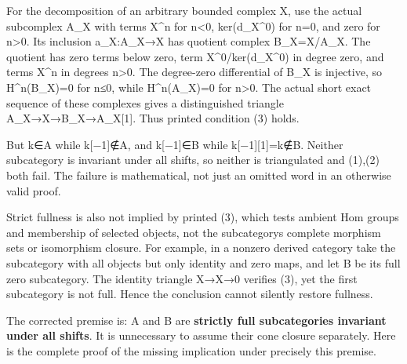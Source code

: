 For the decomposition of an arbitrary bounded complex X,\allowbreak{} use the actual subcomplex A\_\allowbreak{}X with terms X\^{}n for n<0,\allowbreak{} ker(d\_\allowbreak{}X\textasciicircum{}0)\allowbreak{} for n\allowbreak{}=0,\allowbreak{} and zero for n\textgreater0. Its inclusion a\_\allowbreak{}X:\allowbreak{}A\_\allowbreak{}X\allowbreak{}→X has quotient complex B\_\allowbreak{}X\allowbreak{}=X/\allowbreak{}A\_\allowbreak{}X. The quotient has zero terms below zero,\allowbreak{} term X\textasciicircum{}0/\allowbreak{}ker(d\_\allowbreak{}X\textasciicircum{}0)\allowbreak{} in degree zero,\allowbreak{} and terms X\^{}n in degrees n\textgreater0. The degree-zero differential of B\_\allowbreak{}X is injective,\allowbreak{} so H\textasciicircum{}n(B\_\allowbreak{}X)\allowbreak{}\allowbreak{}=0 for n≤0,\allowbreak{} while H\textasciicircum{}n(A\_\allowbreak{}X)\allowbreak{}\allowbreak{}=0 for n\textgreater0. The actual short exact sequence of these complexes gives a distinguished triangle A\_\allowbreak{}X\allowbreak{}→X\allowbreak{}→B\_\allowbreak{}X\allowbreak{}→A\_\allowbreak{}X[1]\allowbreak{}. Thus printed condition (3)\allowbreak{} holds.

But k\allowbreak{}∈A while k[−1]\allowbreak{}\allowbreak{}∉A,\allowbreak{} and k[−1]\allowbreak{}\allowbreak{}∈B while k[−1]\allowbreak{}[1]\allowbreak{}\allowbreak{}=k\allowbreak{}∉B. Neither subcategory is invariant under all shifts,\allowbreak{} so neither is triangulated and (1)\allowbreak{},\allowbreak{}(2)\allowbreak{} both fail. The failure is mathematical,\allowbreak{} not just an omitted word in an otherwise valid proof.

Strict fullness is also not implied by printed (3)\allowbreak{},\allowbreak{} which tests ambient Hom groups and membership of selected objects,\allowbreak{} not the subcategory\textquotesingle s complete morphism sets or isomorphism closure. For example,\allowbreak{} in a nonzero derived category take the subcategory with all objects but only identity and zero maps,\allowbreak{} and let B be its full zero subcategory. The identity triangle X\allowbreak{}→X\allowbreak{}→0 verifies (3)\allowbreak{},\allowbreak{} yet the first subcategory is not full. Hence the conclusion cannot silently restore fullness.

The corrected premise is:\allowbreak{} A and B are \textbf{strictly full subcategories invariant under all shifts}. It is unnecessary to assume their cone closure separately. Here is the complete proof of the missing implication under precisely this premise.

